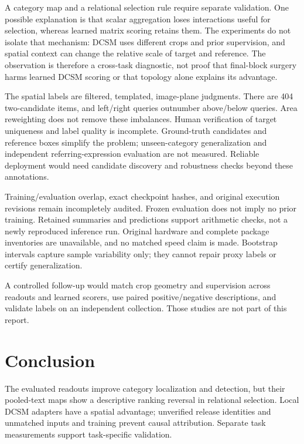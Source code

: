 \documentclass[10pt,twocolumn,letterpaper]{article}
\begin{document}
A category map and a relational selection rule require separate
validation. One possible explanation is that scalar aggregation loses
interactions useful for selection, whereas learned matrix scoring
retains them. The experiments do not isolate that mechanism: DCSM uses
different crops and prior supervision, and spatial context can change
the relative scale of target and reference. The observation is therefore
a cross-task diagnostic, not proof that final-block surgery harms
learned DCSM scoring or that topology alone explains its advantage.

The spatial labels are filtered, templated, image-plane judgments. There
are 404 two-candidate items, and left/right queries outnumber
above/below queries. Area reweighting does not remove these imbalances.
Human verification of target uniqueness and label quality is incomplete.
Ground-truth candidates and reference boxes simplify the problem;
unseen-category generalization and independent referring-expression
evaluation are not measured. Reliable deployment would need candidate
discovery and robustness checks beyond these annotations.

Training/evaluation overlap, exact checkpoint hashes, and original
execution revisions remain incompletely audited. Frozen evaluation does
not imply no prior training. Retained summaries and predictions support
arithmetic checks, not a newly reproduced inference run. Original
hardware and complete package inventories are unavailable, and no
matched speed claim is made. Bootstrap intervals capture sample
variability only; they cannot repair proxy labels or certify
generalization.

A controlled follow-up would match crop geometry and supervision across
readouts and learned scorers, use paired positive/negative descriptions,
and validate labels on an independent collection. Those studies are not
part of this report.

\section{Conclusion}\label{conclusion}

The evaluated readouts improve category localization and detection, but
their pooled-text maps show a descriptive ranking reversal in relational
selection. Local DCSM adapters have a spatial advantage; unverified
release identities and unmatched inputs and training prevent causal
attribution. Separate task measurements support task-specific
validation.
\end{document}
